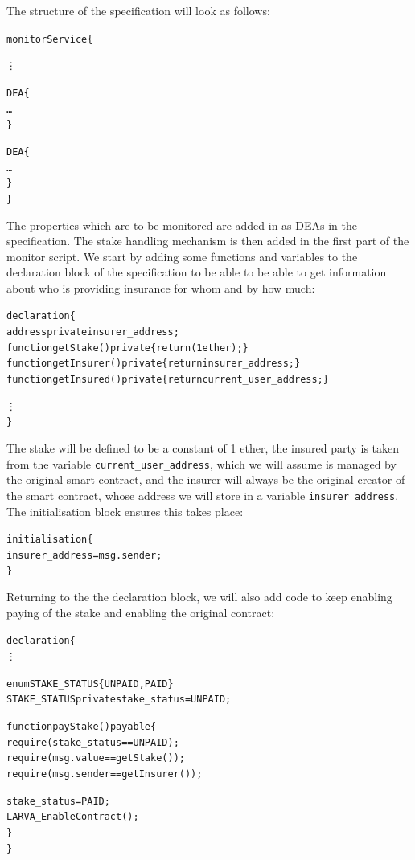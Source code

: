\documentclass{article}
\begin{document}
  The structure of the specification will look as follows:
  
  \small\begin{alltt}
    monitor Service \{
      
      \vdots 
           
      DEA \{
        \ldots 
      \}
      
      DEA \{
        \ldots 
      \}
    \}
  \end{alltt}\normalsize
  
  The properties which are to be monitored are added in as DEAs in the specification. The stake handling mechanism is then added in the first part of the monitor script. We start by adding some functions and variables to the declaration block of the specification to be able to be able to get information about who is providing insurance for whom and by how much:
  
    \small\begin{alltt}
    declaration \{
      address private insurer_address;
      function getStake() private \{ return (1 ether); \}
      function getInsurer() private \{ return insurer\_address; \}
      function getInsured() private \{ return current\_user\_address; \}
      
      \vdots
    \}
    \end{alltt}\normalsize
    
    The stake will be defined to be a constant of 1 ether, the insured party is taken from the variable \texttt{current\_user\_address}, which we will assume is managed by the original smart contract, and the insurer will always be the original creator of the smart contract, whose address we will store in a variable \texttt{insurer\_address}. The initialisation block ensures this takes place:
    
    \small\begin{alltt}
    initialisation \{
      insurer\_address = msg.sender;
    \}
    \end{alltt}\normalsize

    Returning to the the declaration block, we will also add code to keep enabling paying of the stake and enabling the original contract:
    
    \small\begin{alltt}
    declaration \{
      \vdots
      
      enum STAKE\_STATUS \{ UNPAID, PAID \}
      STAKE\_STATUS private stake\_status = UNPAID;
      
      function payStake() payable \{
        require (stake\_status == UNPAID);
        require (msg.value == getStake());
        require (msg.sender == getInsurer());
        
        stake\_status = PAID;
        LARVA\_EnableContract();
      \}
    \}
    \end{alltt}\normalsize
\end{document}
